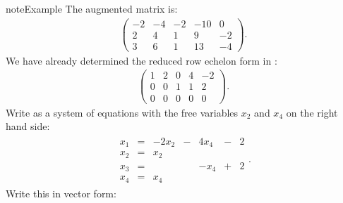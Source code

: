 \documentclass[letterpaper,10pt,english]{jupyterBook}
\begin{document}
\begin{sphinxadmonition}{note}{Example}
\sphinxAtStartPar
The augmented matrix is:
\begin{equation*}
\begin{split}
\left(
\begin{array}{cccc|c}
-2 & -4 & -2 & -10 & 0\\
2 & 4 & 1 & 9 & -2\\
3 & 6 & 1 & 13 & -4
\end{array}\right).
\end{split}
\end{equation*}
\sphinxAtStartPar
We have already determined the reduced row echelon form in  {\hyperref[\detokenize{LinearAlgebra/linear_systems_matrices/echelon_form:ex-gaussian-elimination}]{}}:
\begin{equation*}
\begin{split}
\left(
\begin{array}{cccc|c}
\boxed{1} & 2 & 0 & 4 & -2\\
0 & 0 & \boxed{1} & 1 & 2\\
0 & 0 & 0 & 0 & 0
\end{array}\right).
\end{split}
\end{equation*}
\sphinxAtStartPar
Write as a system of equations with the free variables \(x_2\) and \(x_4\) on the right hand side:
\begin{equation*}
\begin{split}
\begin{alignat*}{4}
x_1 & {}={} & -2x_2 & {}-{} & 4x_4 & {}-{} & 2\\
x_2 & {}={} & x_2\\
x_3 & {}={} &       &       & -x_4 & {}+{} & 2\\
x_4 & {}={} & x_4
\end{alignat*}.\end{split}
\end{equation*}
\sphinxAtStartPar
Write this in vector form:
\begin{equation*}
\begin{split}

\end{split}
\end{equation*}
\end{sphinxadmonition}
\end{document}
